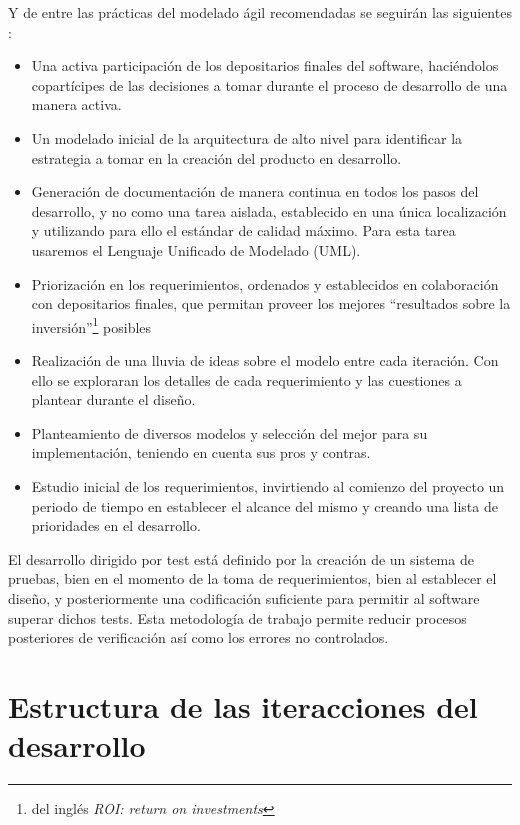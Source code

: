 Y de entre las prácticas del modelado ágil recomendadas se seguirán las siguientes \nocite{AgileModeling}: 
\begin{itemize}
\item Una activa participación de los depositarios finales del software, haciéndolos copartícipes de las decisiones a tomar durante 
el proceso de desarrollo de una manera activa. 
\item Un modelado inicial de la arquitectura de alto nivel para identificar la estrategia a tomar en la creación del producto en desarrollo. 
\item Generación de documentación de manera continua en todos los pasos del desarrollo, y no como una tarea aislada, 
establecido en una única localización y utilizando para ello el estándar de calidad máximo. 
Para esta tarea usaremos el Lenguaje Unificado de Modelado (UML)\cite{UML}. 
\item Priorización en los requerimientos, ordenados y establecidos en colaboración con depositarios finales, 
que permitan proveer los mejores “resultados sobre la inversión”\footnote{del inglés \textit{ROI: return on investments}} posibles 
\item Realización de una lluvia de ideas sobre el modelo entre cada 
iteración. Con ello se exploraran los detalles de cada requerimiento y las cuestiones a plantear durante el diseño. 
\item Planteamiento de diversos modelos y selección del mejor para su implementación, teniendo en cuenta sus pros y contras. 
\item Estudio inicial de los requerimientos, invirtiendo al comienzo del proyecto un periodo de tiempo en establecer el 
alcance del mismo y creando una lista de prioridades en el desarrollo.
\end{itemize}

El desarrollo dirigido por test está definido por la creación de un sistema de pruebas, bien en el momento 
de la toma de requerimientos, bien al establecer el diseño, y posteriormente una codificación suficiente para permitir
al software superar dichos tests. Esta metodología de trabajo permite reducir procesos posteriores de verificación así como los errores no controlados.

\section{Estructura de las iteracciones del desarrollo}
\label{sec:estruc-iter-desarro}

